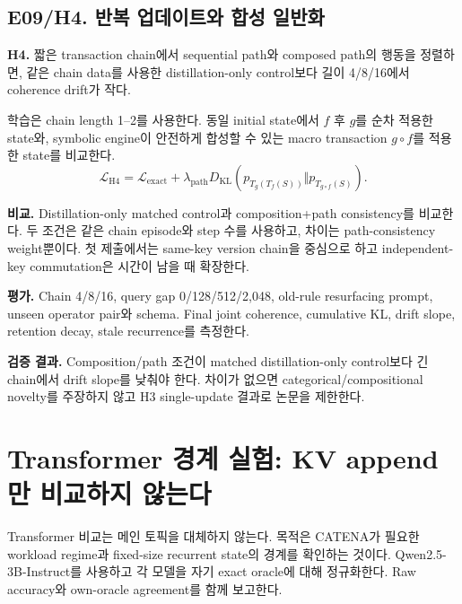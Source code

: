 \documentclass[10.5pt,a4paper]{article}
\begin{document}
\subsection{E09/H4. 반복 업데이트와 합성 일반화}

\begin{keybox}
\textbf{H4.} 짧은 transaction chain에서 sequential path와 composed path의 행동을 정렬하면, 같은 chain data를 사용한 distillation-only control보다 길이 4/8/16에서 coherence drift가 작다.
\end{keybox}

학습은 chain length 1--2를 사용한다. 동일 initial state에서 $f$ 후 $g$를 순차 적용한 state와, symbolic engine이 안전하게 합성할 수 있는 macro transaction $g\circ f$를 적용한 state를 비교한다.
\begin{equation}
\mathcal L_{\mathrm{H4}}=
\mathcal L_{\mathrm{exact}}+
\lambda_{\mathrm{path}}D_{\mathrm{KL}}\!\left(p_{T_g(T_f(S))}\Vert p_{T_{g\circ f}(S)}\right).
\end{equation}

\textbf{비교.} Distillation-only matched control과 composition+path consistency를 비교한다. 두 조건은 같은 chain episode와 step 수를 사용하고, 차이는 path-consistency weight뿐이다. 첫 제출에서는 same-key version chain을 중심으로 하고 independent-key commutation은 시간이 남을 때 확장한다.

\textbf{평가.} Chain 4/8/16, query gap 0/128/512/2,048, old-rule resurfacing prompt, unseen operator pair와 schema. Final joint coherence, cumulative KL, drift slope, retention decay, stale recurrence를 측정한다.

\textbf{검증 결과.} Composition/path 조건이 matched distillation-only control보다 긴 chain에서 drift slope를 낮춰야 한다. 차이가 없으면 categorical/compositional novelty를 주장하지 않고 H3 single-update 결과로 논문을 제한한다.

\section{Transformer 경계 실험: KV append만 비교하지 않는다}

Transformer 비교는 메인 토픽을 대체하지 않는다. 목적은 CATENA가 필요한 workload regime과 fixed-size recurrent state의 경계를 확인하는 것이다. Qwen2.5-3B-Instruct를 사용하고 각 모델을 자기 exact oracle에 대해 정규화한다. Raw accuracy와 own-oracle agreement를 함께 보고한다.
\end{document}
